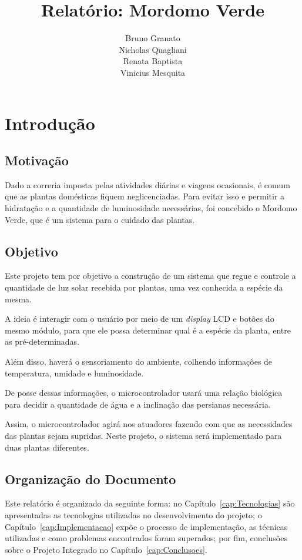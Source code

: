 \documentclass[a4paper,12pt]{report}
\title{ Relatório: Mordomo Verde \\}
\author{Bruno Granato \\
	Nicholas Quagliani\\
	Renata Baptista\\
	Vinicius Mesquita}
\begin{document}
\maketitle


\tableofcontents
\cleardoublepage
\chapter{Introdução}
	\section{Motivação}
		Dado a correria imposta pelas atividades diárias e viagens ocasionais, é comum que as plantas domésticas fiquem neglicenciadas. Para evitar isso e permitir a hidratação e a quantidade de luminosidade necessárias, foi concebido o Mordomo Verde, que é um sistema para o cuidado das plantas.
	\section{Objetivo}
		Este projeto tem por objetivo a construção de um sistema que regue e controle a quantidade de luz solar recebida por plantas, uma vez conhecida a espécie da mesma.
		
		A ideia é interagir com o usuário por meio de um \textit{display} LCD e botões do mesmo módulo, para que ele possa determinar qual é a espécie da planta, entre as pré-determinadas. 
		
		Além disso, haverá o sensoriamento do ambiente, colhendo informações de temperatura, umidade e luminosidade.
		
		De posse dessas informações, o microcontrolador usará uma relação biológica para decidir a quantidade de água e a inclinação das persianas necessária. 
		
		Assim, o microcontrolador agirá nos atuadores fazendo com que as necessidades das plantas sejam supridas. Neste projeto, o sistema será implementado para duas plantas diferentes.
	\section{Organização do Documento}
	    Este relatório é organizado da seguinte forma: no Capítulo~\ref{cap:Tecnologias} são apresentadas as tecnologias utilizadas no desenvolvimento do projeto; o Capítulo~\ref{cap:Implementacao} expõe o processo de implementação, as técnicas utilizadas e como problemas encontrados foram superados; por fim, conclusões sobre o Projeto Integrado no Capítulo~\ref{cap:Conclusoes}.
\end{document}
